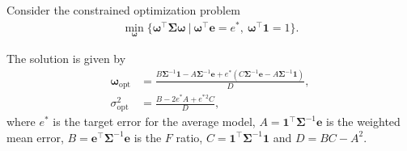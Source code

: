 \documentclass[10pt,a4paper]{amsart}
\begin{document}
\begin{lemma}
Consider the constrained optimization problem 
\begin{align} \label{opt1}
\min_{\boldsymbol{\omega}} \{ \boldsymbol{\omega}^\top \mathbf{\Sigma} \boldsymbol{\omega}~|~\boldsymbol{\omega}^\top \mathbf{e} = e^*,~\boldsymbol{\omega}^\top \mathbf{1} = 1\}.
\end{align}

The solution is given by 
\begin{equation}
\begin{aligned} \label{opt2}
\boldsymbol{\omega}_{\text{opt}} &= \frac{B \mathbf{\Sigma}^{-1} \mathbf{1} - A \mathbf{\Sigma}^{-1} \mathbf{e} + e^* \left( C \mathbf{\Sigma}^{-1} \mathbf{e} - A \mathbf{\Sigma}^{-1} \mathbf{1} \right)}{D}, \\
\sigma_{\text{opt}}^2 &= \frac{B - 2e^* A + e^*{^2} C}{D},
\end{aligned}
\end{equation}
where $e^*$ is the target error for the average model, $A = \mathbf{1}^\top \mathbf{\Sigma}^{-1} \mathbf{e}$ is the weighted mean error, $B = \mathbf{e}^\top \mathbf{\Sigma}^{-1} \mathbf{e}$ is the $F$ ratio, $C = \mathbf{1}^\top \mathbf{\Sigma}^{-1}\mathbf{1}$ and $D = BC - A^2$.
\end{lemma}
\end{document}
